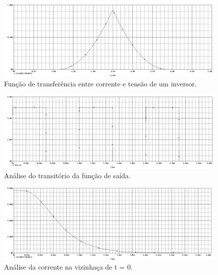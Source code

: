 \documentclass[12pt, a4paper]{article}
\begin{document}
    \newpage
    
    \begin{figure}[h!] 
        \centering
        \includegraphics[width=1\textheight, angle=-90]{graf332}
        \caption{Função de transferência entre corrente e tensão de um inversor.}        
        \label{graf332}
    \end{figure}
    
    \newpage
    
    \begin{figure}[h!] 
        \centering
        \includegraphics[width=1\textheight, angle=-90]{graf333}
        \caption{Análise do transitório da função de saída.}        
        \label{graf334}
    \end{figure}
    
    \newpage
    
    \begin{figure}[h!] 
        \centering
        \includegraphics[width=1\textheight, angle=-90]{graf335}
        \caption{Análise da corrente na vizinhaça de t = 0.}        
        \label{graf335}
    \end{figure}
    
    
    
\end{document}
